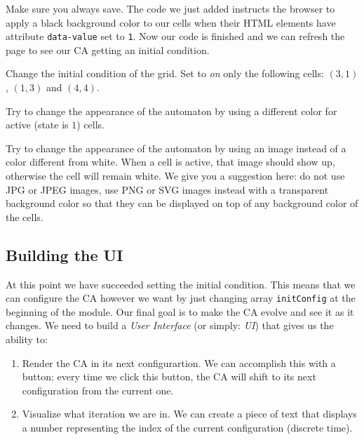 Make sure you always save. The code we just added instructs the browser to apply a black background color
to our cells when their HTML elements have attribute \texttt{data-value} set to \texttt{1}.
Now our code is finished and we can refresh the page to see our CA getting an initial
condition.

\begin{problem}
\label{prob:changeinit}
Change the initial condition of the grid. Set to \textit{on} only the following
cells: $(3,1)$, $(1,3)$ and $(4,4)$.
\end{problem}

\begin{problem}
\label{prob:cacolor}
Try to change the appearance of the automaton by using a different color for active (state is $1$)
cells.
\end{problem}

\begin{problem}
\label{prob:flowers}
Try to change the appearance of the automaton by using an image instead of a color different from white.
When a cell is active, that image should show up, otherwise the cell will remain white.
We give you a suggestion here: do not use JPG or JPEG images, use PNG or SVG images instead with a transparent
background color so that they can be displayed on top of any background color of the cells.
\end{problem}

\subsection{Building the UI}
At this point we have succeeded setting the initial condition. This means that we can configure the CA however
we want by just changing array \texttt{initConfig} at the beginning of the module. Our final goal is to
make the CA evolve and see it as it changes. We need to build a \textit{User Interface} (or simply: \textit{UI})
that gives us the ability to:

\begin{enumerate}
\item Render the CA in its next configurartion. We can accomplish this with a button: every time we
click this button, the CA will shift to its next configuration from the current one.
\item Visualize what iteration we are in. We can create a piece of text that displays a number
representing the index of the current configuration (discrete time).
\end{enumerate}

